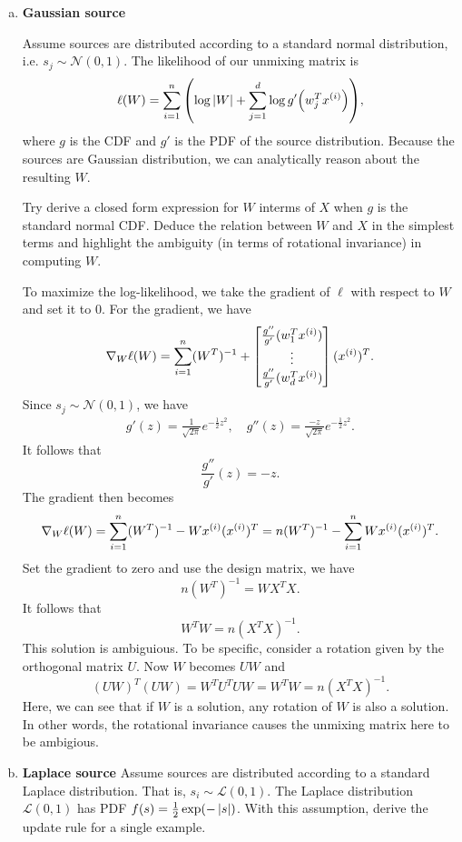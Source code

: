 \documentclass[12pt,letterpaper,boxed]{hmcpset}
\begin{document}
\begin{solution}
  \begin{enumerate}[(a)]
    \item \textbf{Gaussian source}
    
    Assume sources are distributed according to a standard normal distribution, i.e. $s_j \sim \mathcal{N}(0,1)$. The likelihood of our unmixing matrix is
    \[
    \ell(W) = \sum_{i=1}^n \qty(\log \abs{W} + \sum_{j=1}^d \log g' \qty(w_j^T \xx)),
    \]
    where $g$ is the CDF and $g'$ is the PDF of the source distribution. Because the sources are Gaussian distribution, we can analytically reason about the resulting $W$.

    Try derive a closed form expression for $W$ interms of $X$ when $g$ is the standard normal CDF. Deduce the relation between $W$ and $X$ in the simplest terms and highlight the ambiguity (in terms of rotational invariance) in computing $W$.

    To maximize the log-likelihood, we take the gradient of $\ell$ with respect to $W$ and set it to $0$. For the gradient, we have
    \[
    \nabla_W \ell(W) = \sum_{i=1}^n (W^{T})^{-1} + \begin{bmatrix}
      \frac{g''}{g'} (w_1^T \xx) \\
      \vdots \\
      \frac{g''}{g'} (w_d^T \xx)
    \end{bmatrix}
    (\xx)^T.
    \]
    Since $s_j \sim \mathcal N(0,1)$, we have
    \[
    \begin{aligned}
      g'(z) = \frac{1}{\sqrt{2\pi}} e^{-\frac{1}{2} z^2}, \quad
      g''(z) = \frac{-z}{\sqrt{2\pi}} e^{-\frac{1}{2} z^2}.
    \end{aligned}
    \]
    It follows that
    \[
    \frac{g''}{g'}(z) = -z.
    \]
    The gradient then becomes
    \[
    \nabla_W \ell(W) = \sum_{i=1}^n (W^{T})^{-1} - W \xx (\xx)^T = n (W^{T})^{-1} - \sum_{i=1}^n W \xx (\xx)^T.
    \]
    Set the gradient to zero and use the design matrix, we have
    \[
    n (W^T)^{-1} = W X^T X.
    \]
    It follows that 
    \[
    W^T W = n (X^T X)^{-1}.
    \]
    This solution is ambiguious. To be specific, consider a rotation given by the orthogonal matrix $U$. Now $W$ becomes $UW$ and 
    \[
    (UW)^T (UW) = W^T U^T U W = W^T W = n (X^T X)^{-1}.
    \]
    Here, we can see that if $W$ is a solution, any rotation of $W$ is also a solution. In other words, the rotational invariance causes the unmixing matrix here to be ambigious.

    \item \textbf{Laplace source}
    Assume sources are distributed according to a standard Laplace distribution. That is, $s_i \sim \mathcal L(0,1)$. The Laplace distribution $\mathcal{L} (0,1)$ has PDF $f(s) = \frac{1}{2} \exp(- \left\lvert s\right\rvert)$. With this assumption, derive the update rule for a single example.


\end{enumerate}
\end{solution}
\end{document}
